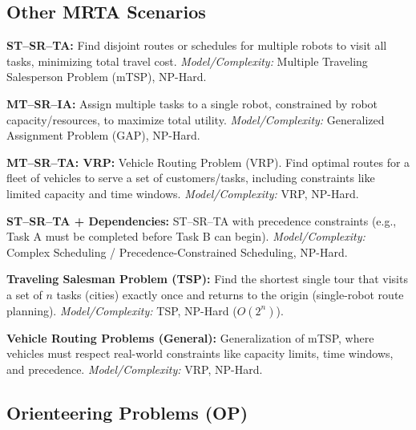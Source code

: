 \subsection*{Other MRTA Scenarios}
\begin{tightitemize}
    \item \textbf{ST–SR–TA:} Find disjoint routes or schedules for multiple robots to visit all tasks, minimizing total travel cost. \textit{Model/Complexity:} Multiple Traveling Salesperson Problem (mTSP), NP-Hard.

    \item \textbf{MT–SR–IA:} Assign multiple tasks to a single robot, constrained by robot capacity/resources, to maximize total utility. \textit{Model/Complexity:} Generalized Assignment Problem (GAP), NP-Hard.

    \item \textbf{MT–SR–TA: VRP:} Vehicle Routing Problem (VRP). Find optimal routes for a fleet of vehicles to serve a set of customers/tasks, including constraints like limited capacity and time windows. \textit{Model/Complexity:} VRP, NP-Hard.

    \item \textbf{ST–SR–TA + Dependencies:} ST–SR–TA with precedence constraints (e.g., Task A must be completed before Task B can begin). \textit{Model/Complexity:} Complex Scheduling / Precedence-Constrained Scheduling, NP-Hard.

    \item \textbf{Traveling Salesman Problem (TSP):} Find the shortest single tour that visits a set of \(n\) tasks (cities) exactly once and returns to the origin (single-robot route planning). \textit{Model/Complexity:} TSP, NP-Hard (\(O(2^n)\)).

    \item \textbf{Vehicle Routing Problems (General):} Generalization of mTSP, where vehicles must respect real-world constraints like capacity limits, time windows, and precedence. \textit{Model/Complexity:} VRP, NP-Hard.
\end{tightitemize}

\subsection*{Orienteering Problems (OP)}

